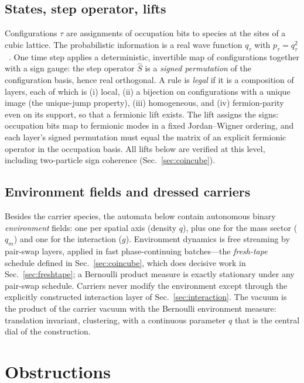 \documentclass[aps,prd,twocolumn,superscriptaddress,nofootinbib,floatfix]{revtex4-2}
\begin{document}
\subsection{States, step operator, lifts}

Configurations $\tau$ are assignments of occupation bits to species at the
sites of a cubic lattice. The probabilistic information is a real wave
function $q_\tau$ with $p_\tau=q_\tau^2$~\cite{Wetterich2022}. One time
step applies a deterministic, invertible map of configurations together
with a sign gauge: the step operator $\hat S$ is a \emph{signed
permutation} of the configuration basis, hence real orthogonal. A rule is
\emph{legal} if it is a composition of layers, each of which is (i) local,
(ii) a bijection on configurations with a unique image (the unique-jump
property), (iii) homogeneous, and (iv) fermion-parity even on its support,
so that a fermionic lift exists. The lift assigns the signs: occupation
bits map to fermionic modes in a fixed Jordan--Wigner ordering, and each
layer's signed permutation must equal the matrix of an explicit fermionic
operator in the occupation basis. All lifts below are verified at this
level, including two-particle sign coherence (Sec.~\ref{sec:coincube}).

\subsection{Environment fields and dressed carriers}

Besides the carrier species, the automata below contain autonomous binary
\emph{environment} fields: one per spatial axis (density $q$), plus one for
the mass sector ($q_m$) and one for the interaction ($g$). Environment
dynamics is free streaming by pair-swap layers, applied in fast
phase-continuing batches---the \emph{fresh-tape} schedule defined in
Sec.~\ref{sec:coincube}, which does decisive work in
Sec.~\ref{sec:freshtape}; a Bernoulli product measure is exactly
stationary under any pair-swap schedule. Carriers never modify the environment except through
the explicitly constructed interaction layer of Sec.~\ref{sec:interaction}.
The vacuum is the product of the carrier vacuum with the Bernoulli
environment measure: translation invariant, clustering, with a continuous
parameter $q$ that is the central dial of the construction.

\section{Obstructions}
\label{sec:obstructions}
\end{document}
